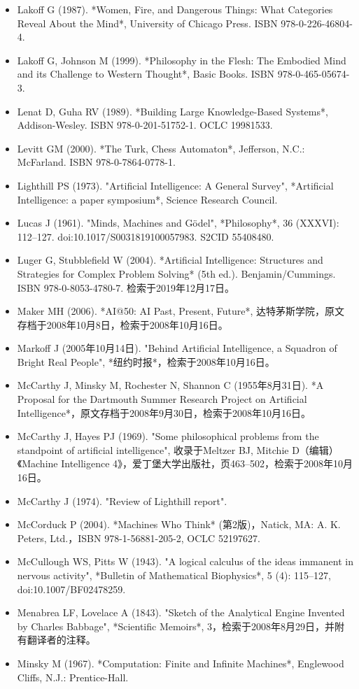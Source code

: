 \begin{itemize}
\item Lakoff G (1987). *Women, Fire, and Dangerous Things: What Categories Reveal About the Mind*, University of Chicago Press. ISBN 978-0-226-46804-4.  
\item Lakoff G, Johnson M (1999). *Philosophy in the Flesh: The Embodied Mind and its Challenge to Western Thought*, Basic Books. ISBN 978-0-465-05674-3.  
\item Lenat D, Guha RV (1989). *Building Large Knowledge-Based Systems*, Addison-Wesley. ISBN 978-0-201-51752-1. OCLC 19981533.  
\item Levitt GM (2000). *The Turk, Chess Automaton*, Jefferson, N.C.: McFarland. ISBN 978-0-7864-0778-1.
\item Lighthill PS (1973). "Artificial Intelligence: A General Survey", *Artificial Intelligence: a paper symposium*, Science Research Council.  
\item Lucas J (1961). "Minds, Machines and Gödel", *Philosophy*, 36 (XXXVI): 112–127. doi:10.1017/S0031819100057983. S2CID 55408480.  
\item Luger G, Stubblefield W (2004). *Artificial Intelligence: Structures and Strategies for Complex Problem Solving* (5th ed.). Benjamin/Cummings. ISBN 978-0-8053-4780-7. 检索于2019年12月17日。
\item Maker MH (2006). *AI@50: AI Past, Present, Future*, 达特茅斯学院，原文存档于2008年10月8日，检索于2008年10月16日。  
\item Markoff J (2005年10月14日). "Behind Artificial Intelligence, a Squadron of Bright Real People", *纽约时报*，检索于2008年10月16日。  
\item McCarthy J, Minsky M, Rochester N, Shannon C (1955年8月31日). *A Proposal for the Dartmouth Summer Research Project on Artificial Intelligence*，原文存档于2008年9月30日，检索于2008年10月16日。  
\item McCarthy J, Hayes PJ (1969). "Some philosophical problems from the standpoint of artificial intelligence", 收录于Meltzer BJ, Mitchie D（编辑）《Machine Intelligence 4》，爱丁堡大学出版社，页463–502，检索于2008年10月16日。
\item McCarthy J (1974). "Review of Lighthill report".  
\item McCorduck P (2004). *Machines Who Think* (第2版)，Natick, MA: A. K. Peters, Ltd.，ISBN 978-1-56881-205-2, OCLC 52197627.  
\item McCullough WS, Pitts W (1943). "A logical calculus of the ideas immanent in nervous activity", *Bulletin of Mathematical Biophysics*, 5 (4): 115–127, doi:10.1007/BF02478259.  
\item Menabrea LF, Lovelace A (1843). "Sketch of the Analytical Engine Invented by Charles Babbage", *Scientific Memoirs*, 3，检索于2008年8月29日，并附有翻译者的注释。  
\item Minsky M (1967). *Computation: Finite and Infinite Machines*, Englewood Cliffs, N.J.: Prentice-Hall.
\end{itemize}
